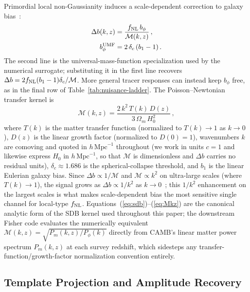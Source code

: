 \documentclass[aps,prd,twocolumn,superscriptaddress,showpacs,preprintnumbers,nofootinbib,longbibliography,floatfix]{revtex4-2}
\newcommand{\fnl}{f_{\rm NL}}
\begin{document}
Primordial local non-Gaussianity induces a scale-dependent correction to galaxy bias~\cite{Dalal:2007cu,Slosar:2008}:
\begin{align}
\Delta b(k,z) &= \frac{\fnl\,b_\phi}{\mathcal{M}(k,z)}\,,
\label{eq:sdb}\\
b_\phi^{\rm UMF} &= 2\,\delta_c\,(b_1-1)\,.
\label{eq:bphi_umf}
\end{align}
The second line is the universal-mass-function specialization used by the numerical surrogate; substituting it in the first line recovers $\Delta b=2\fnl(b_1-1)\delta_c/\mathcal{M}$. More general tracer responses can instead keep $b_\phi$ free, as in the final row of Table~\ref{tab:nuisance-ladder}. The Poisson--Newtonian transfer kernel is
\begin{equation}
\mathcal{M}(k,z) = \frac{2\,k^2\,T(k)\,D(z)}{3\,\Omega_m\,H_0^2}\,,
\label{eq:Mkz}
\end{equation}
where $T(k)$ is the matter transfer function (normalized to $T(k)\to 1$ as $k\to 0$), $D(z)$ is the linear growth factor (normalized to $D(0)=1$), wavenumbers $k$ are comoving and quoted in $h\,\mathrm{Mpc}^{-1}$ throughout (we work in units $c=1$ and likewise express $H_0$ in $h\,\mathrm{Mpc}^{-1}$, so that $\mathcal{M}$ is dimensionless and $\Delta b$ carries no residual units), $\delta_c \approx 1.686$ is the spherical-collapse threshold, and $b_1$ is the linear Eulerian galaxy bias. Since $\Delta b \propto 1/\mathcal{M}$ and $\mathcal{M} \propto k^2$ on ultra-large scales (where $T(k)\to 1$), the signal grows as $\Delta b \propto 1/k^2$ as $k\to 0$~\cite{Dalal:2007cu,Slosar:2008}; this $1/k^2$ enhancement on the largest scales is what makes scale-dependent bias the most sensitive single channel for local-type $\fnl$. Equations~(\ref{eq:sdb})--(\ref{eq:Mkz}) are the canonical analytic form of the SDB kernel used throughout this paper; the downstream Fisher code evaluates the numerically equivalent $\mathcal{M}(k,z)=\sqrt{P_m(k,z)/P_\phi(k)}$ directly from CAMB's linear matter power spectrum $P_m(k,z)$ at each survey redshift, which sidesteps any transfer-function/growth-factor normalization convention entirely.

\subsection{Template Projection and Amplitude Recovery}
\label{sec:template}
\end{document}

